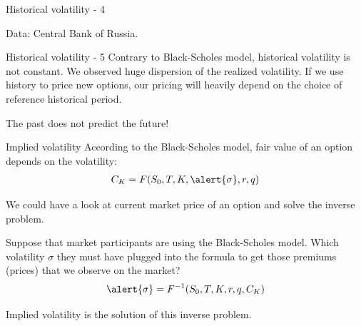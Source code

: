 \documentclass{beamer}
\begin{document}
\begin{frame}{Historical volatility - 4}
\centering
{}

\scriptsize Data: Central Bank of Russia.
\end{frame}



\begin{frame}{Historical volatility - 5}
\justify
Contrary to Black-Scholes model, historical volatility is not constant. We observed huge dispersion of the realized volatility. If we use history to price new options, our pricing will heavily depend on the choice of reference historical period.

\justify
The past does not predict the future!
\end{frame}



\begin{frame}{Implied volatility}
\justify
According to the Black-Scholes model, fair value of an option depends on the volatility:
\begin{align*}
C_K = F(S_0, T, K, \alert{\sigma}, r, q)
\end{align*}

\justify
We could have a look at current market price of an option and solve the inverse problem.

\justify
Suppose that market participants are using the Black-Scholes model. Which volatility $\sigma$ they must have plugged into the formula to get those premiums (prices) that we observe on the market?
\begin{align*}
\alert{\sigma} = F^{-1}(S_0, T, K, r, q, C_K)
\end{align*}

\justify
\alert{Implied} volatility is the solution of this inverse problem.
\end{frame}
\end{document}
